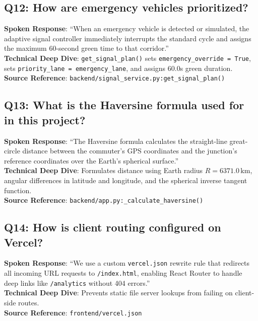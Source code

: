 \subsection*{Q12: How are emergency vehicles prioritized?}
\begin{interviewbox}
\textbf{Spoken Response}: ``When an emergency vehicle is detected or simulated, the adaptive signal controller immediately interrupts the standard cycle and assigns the maximum 60-second green time to that corridor.''\\
\textbf{Technical Deep Dive}: \texttt{get\_signal\_plan()} sets \texttt{emergency\_override = True}, sets \texttt{priority\_lane = emergency\_lane}, and assigns 60.0s green duration.\\
\textbf{Source Reference}: \texttt{backend/signal\_service.py:get\_signal\_plan()}
\end{interviewbox}

\subsection*{Q13: What is the Haversine formula used for in this project?}
\begin{interviewbox}
\textbf{Spoken Response}: ``The Haversine formula calculates the straight-line great-circle distance between the commuter's GPS coordinates and the junction's reference coordinates over the Earth's spherical surface.''\\
\textbf{Technical Deep Dive}: Formulates distance using Earth radius $R = 6371.0\,\text{km}$, angular differences in latitude and longitude, and the spherical inverse tangent function.\\
\textbf{Source Reference}: \texttt{backend/app.py:\_calculate\_haversine()}
\end{interviewbox}

\subsection*{Q14: How is client routing configured on Vercel?}
\begin{interviewbox}
\textbf{Spoken Response}: ``We use a custom \texttt{vercel.json} rewrite rule that redirects all incoming URL requests to \texttt{/index.html}, enabling React Router to handle deep links like \texttt{/analytics} without 404 errors.''\\
\textbf{Technical Deep Dive}: Prevents static file server lookups from failing on client-side routes.\\
\textbf{Source Reference}: \texttt{frontend/vercel.json}
\end{interviewbox}

